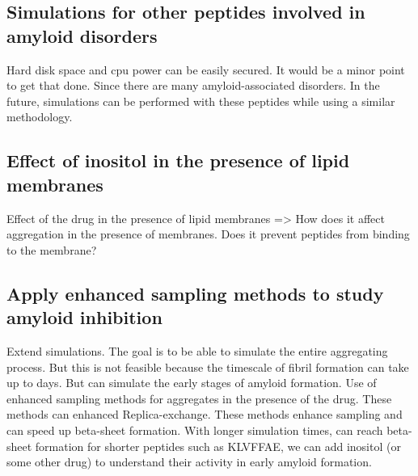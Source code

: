 \subsection{Simulations for other peptides involved in amyloid disorders}
Hard disk space and cpu power can be easily secured.  It would be a minor point to get that done.  Since there are many amyloid-associated disorders. In the future, simulations can be performed with these peptides while using a similar methodology. 

\subsection{Effect of inositol in the presence of lipid membranes}
Effect of the drug in the presence of lipid membranes => How does it affect aggregation in the presence of membranes. Does it prevent peptides from binding to the membrane?

\subsection{Apply enhanced sampling methods to study amyloid inhibition}
Extend simulations. The goal is to be able to simulate the entire aggregating process.  But this is not feasible because the timescale of fibril formation can take up to days. But can simulate the early stages of amyloid formation.  Use of enhanced sampling methods for aggregates in the presence of the drug.  These methods can enhanced Replica-exchange.  These methods enhance sampling and can speed up beta-sheet formation. With longer simulation times, can reach beta-sheet formation for shorter peptides such as KLVFFAE, we can add inositol (or some other drug) to understand their activity in early amyloid formation.




